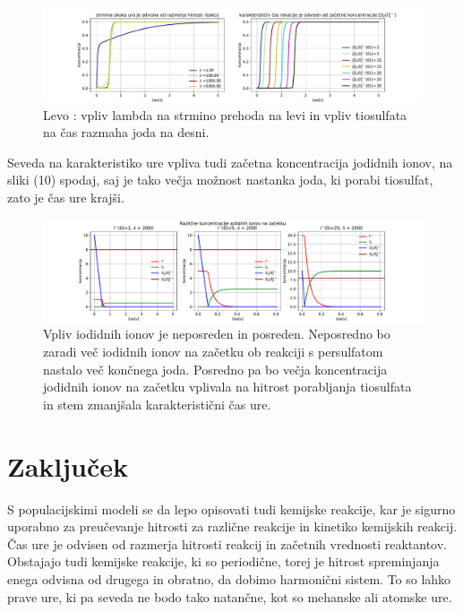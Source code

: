 \documentclass[11pt, a4paper]{article}
\begin{document}
\begin{figure}[H]
\hspace*{-2cm}     
  \includegraphics[width=20cm]{jodova_ura_2_karakteristika.pdf}
  \caption{Levo : vpliv lambda na strmino prehoda na levi in vpliv tiosulfata na čas razmaha joda na desni.} 
\end{figure}
Seveda na karakteristiko ure vpliva tudi začetna koncentracija jodidnih ionov, na sliki (10) spodaj, saj je tako večja možnost nastanka joda, ki porabi tiosulfat, zato je čas ure krajši.

\begin{figure}[H]
\hspace*{-2cm}     
  \includegraphics[width=20cm]{jodova_ura_2a_daljsanje_casa_jod.pdf}
  \caption{Vpliv iodidnih ionov je neposreden in posreden. Neposredno bo zaradi več iodidnih ionov na začetku ob reakciji s persulfatom nastalo več končnega joda. Posredno pa bo večja koncentracija jodidnih ionov na začetku vplivala na hitrost porabljanja tiosulfata in stem zmanjšala karakteristični čas ure.} 
\end{figure}
\section{Zaključek}
S populacijskimi modeli se da lepo opisovati tudi kemijske reakcije, kar je sigurno uporabno za preučevanje hitrosti za različne reakcije in kinetiko kemijskih reakcij. Čas ure je odvisen od razmerja hitrosti reakcij in začetnih vrednosti reaktantov. Obstajajo tudi kemijske reakcije, ki so periodične, torej je hitrost spreminjanja enega odvisna od drugega in obratno, da dobimo harmonični sistem. To so lahko prave ure, ki pa seveda ne bodo tako natančne, kot so mehanske ali atomske ure.

\end{document}
